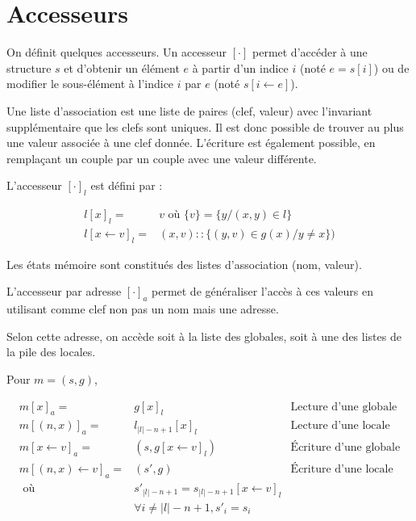 \section{Accesseurs}

On définit quelques accesseurs. Un accesseur $ [ \cdot ] $ permet d'accéder à
une structure $s$ et d'obtenir un élément $e$ à partir d'un indice $i$ (noté $e
= s [ i ]$) ou de modifier le sous-élément à l'indice $i$ par $e$ (noté $ s [ i
← e ] $).

\begin{definition}

  Une liste d'association est une liste de paires (clef, valeur) avec
  l'invariant supplémentaire que les clefs sont uniques. Il est donc possible de
  trouver au plus une valeur associée à une clef donnée. L'écriture est
  également possible, en remplaçant un couple par un couple avec une valeur
  différente.

  L'accesseur $[\cdot]_l$ est défini par :

  \begin{align*}
    l[x]_l     = & v \mbox{ où } \{v\} = \{y / (x, y) ∈ l\} \\
    l[x ← v]_l = & (x, v) :: \{ (y, v) ∈ g(x) / y ≠ x \})
  \end{align*}

\end{definition}

\begin{definition}

  Les états mémoire sont constitués des listes d'association (nom, valeur).

  L'accesseur par adresse $[\cdot]_a$ permet de généraliser l'accès à ces
  valeurs en utilisant comme clef non pas un nom mais une adresse.

  Selon cette adresse, on accède soit à la liste des globales, soit à une des
  listes de la pile des locales.

  Pour $m = (s, g)$,

  \begin{align*}
    m [x]_a          = & g[x]_l        & \textrm{Lecture d'une globale} \\
    m [(n, x)]_a     = & l_{|l|-n+1}[x]_l      & \textrm{Lecture d'une locale} \\
    m [x ← v]_a      = & (s, g[x←v]_l) & \textrm{Écriture d'une globale} \\
    m [(n, x) ← v]_a = & (s', g)       & \textrm{Écriture d'une locale} \\
           \mbox{ où } & s'_{|l|-n+1} = s_{|l|-n+1}[x ← v]_l \\
                       & ∀ i ≠ |l|-n+1, s'_i = s_i
  \end{align*}

\end{definition}

